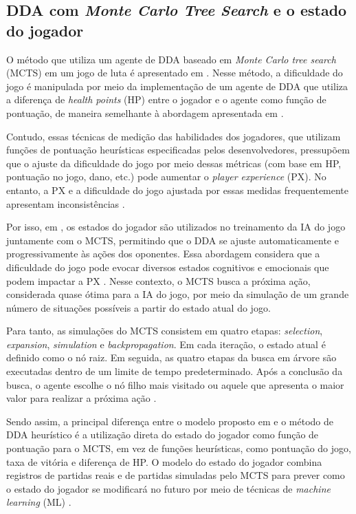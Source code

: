 \subsection{DDA com \textit{Monte Carlo Tree Search} e o estado do jogador}    
    O método que utiliza um agente de DDA baseado em 
    \textit{Monte Carlo tree search} (MCTS) em um jogo
    de luta é apresentado em 
    \cite{demediuk2017monte,ishihara2018monte}. Nesse 
    método, a dificuldade do jogo é manipulada por meio
    da implementação de um agente de DDA que utiliza a 
    diferença de \textit{health points} (HP) entre o 
    jogador e o agente como função de pontuação, de 
    maneira semelhante à abordagem apresentada em 
    \cite{moon2022diversifying}.
    
    Contudo, essas técnicas de medição das habilidades dos
    jogadores, que utilizam funções de pontuação heurísticas
    especificadas pelos desenvolvedores, pressupõem que o
    ajuste da dificuldade do jogo por meio dessas métricas
    (com base em HP, pontuação no jogo, dano, etc.)
    pode aumentar o \textit{player experience} (PX). 
    No entanto, a PX e a dificuldade do jogo 
    ajustada por essas medidas frequentemente apresentam 
    inconsistências
    \cite{ang2017comparing,constant2019dynamic}.

    Por isso, em \cite{moon2022diversifying}, os estados 
    do jogador são utilizados no treinamento da IA do 
    jogo juntamente com o MCTS, permitindo que o DDA se 
    ajuste automaticamente e progressivamente às ações 
    dos oponentes. Essa abordagem considera que a 
    dificuldade do jogo pode evocar diversos estados 
    cognitivos e emocionais que podem impactar a PX 
    \cite{kivikangas2011review}. Nesse contexto, o MCTS 
    busca a próxima ação, considerada quase 
    ótima para a IA do jogo, por meio da simulação de 
    um grande número de situações possíveis a 
    partir do estado atual do jogo. 
    
    Para tanto, as simulações do MCTS consistem em quatro 
    etapas: \textit{selection}, \textit{expansion}, 
    \textit{simulation} e \textit{backpropagation}. 
    Em cada iteração, o estado atual é definido como o nó
    raiz. Em seguida, as quatro etapas da busca em 
    árvore são executadas dentro de um limite
    de tempo predeterminado. Após a conclusão da busca, 
    o agente escolhe o nó filho mais visitado ou aquele 
    que apresenta o maior valor para realizar a próxima 
    ação \cite{moon2022diversifying}.

    Sendo assim, a principal diferença entre o modelo 
    proposto em \cite{moon2022diversifying} e o método de 
    DDA heurístico é a utilização direta do estado do 
    jogador como função de pontuação para o MCTS, em vez
    de funções heurísticas, como pontuação do jogo, taxa
    de vitória e diferença de HP. O modelo do estado do
    jogador combina registros de partidas reais e de 
    partidas simuladas pelo MCTS para prever como o 
    estado do jogador se modificará no futuro por meio
    de técnicas de \textit{machine learning} (ML) 
    \cite{moon2022diversifying}.